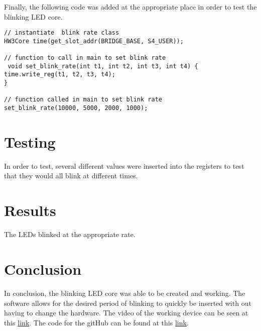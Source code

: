 \documentclass[12pt]{article}
\begin{document}
Finally, the following code was added at the appropriate place in order to test the blinking LED core.

\begin{lstlisting}
// instantiate  blink rate class
HW3Core time(get_slot_addr(BRIDGE_BASE, S4_USER));

// function to call in main to set blink rate
 void set_blink_rate(int t1, int t2, int t3, int t4) {
time.write_reg(t1, t2, t3, t4);
}

// function called in main to set blink rate
set_blink_rate(10000, 5000, 2000, 1000);
\end{lstlisting}
\section{Testing}
In order to test, several different values were inserted into the registers to test that they would all blink at different times.


\section{Results}
The LEDs blinked at the appropriate rate.

\section{Conclusion}
In conclusion, the blinking LED core was able to be created and working. The software allows for the desired period of blinking to quickly be inserted with out having to change the hardware. The video of the working device can be seen at this \href{https://www.youtube.com/watch?v=IYFFpxjsxYw}{link}. 
The code for the gitHub can be found at this \href {https://github.com/andrew-clinkenbeard/Blinking-Led-Core} {link}.
\end{document}

